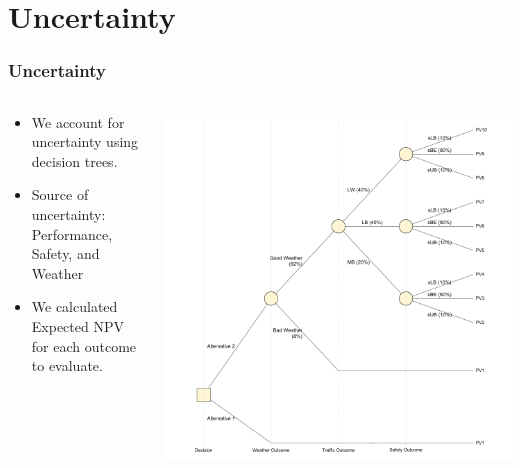 \documentclass{beamer}
\begin{document}
\section{Uncertainty}
\begin{frame}
  \frametitle{Uncertainty}
  \begin{columns}
    \begin{column}{0.4\textwidth}
      \begin{itemize}
      \item We account for uncertainty using decision trees.
      \item Source of uncertainty: Performance, Safety, and Weather
      \item We calculated Expected NPV for each outcome to evaluate.
      \end{itemize}
    \end{column}
    \begin{column}{0.6\textwidth}
      \centering
      \includegraphics[width=\textwidth]{../../R/decisiontree}
    \end{column}
  \end{columns}
\end{frame}
\end{document}
